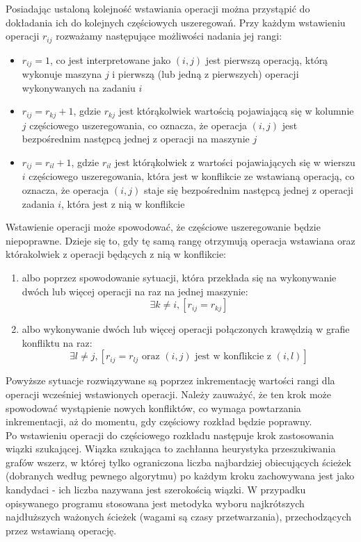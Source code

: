 \documentclass[brudnopis]{xmgr}
\begin{document}
Posiadając ustaloną kolejność wstawiania operacji można przystąpić do dokładania ich do kolejnych częściowych uszeregowań. Przy każdym wstawieniu operacji $r_{ij}$ rozważamy następujące możliwości nadania jej rangi:
\begin{itemize}
    \item $r_{ij} = 1$, co jest interpretowane jako $(i,j)$ jest pierwszą operacją, którą wykonuje maszyna $j$ i pierwszą (lub jedną z pierwszych) operacji wykonywanych na zadaniu $i$
    \item $r_{ij} = r_{kj} + 1$, gdzie $r_{kj}$ jest którąkolwiek wartością pojawiającą się w kolumnie $j$ częściowego uszeregowania, co oznacza, że operacja $(i,j)$ jest bezpośrednim następcą jednej z operacji na maszynie $j$
    \item $r_{ij} = r_{il} + 1$, gdzie $r_{il}$ jest którąkolwiek z wartości pojawiających się w wierszu $i$ częściowego uszeregowania, która jest w konflikcie ze wstawianą operacją, co oznacza, że operacja $(i,j)$ staje się bezpośrednim następcą jednej z operacji zadania $i$, która jest z nią w konflikcie
\end{itemize}

Wstawienie operacji może spowodować, że częściowe uszeregowanie będzie niepoprawne. Dzieje się to, gdy tę samą rangę otrzymują operacja wstawiana oraz którakolwiek z operacji będących z nią w konflikcie:
\begin{enumerate}
    \item albo poprzez spowodowanie sytuacji, która przekłada się na wykonywanie dwóch lub więcej operacji na raz na jednej maszynie:
    $$\exists k \neq i, [r_{ij}=r_{kj}]$$
    \item albo wykonywanie dwóch lub więcej operacji połączonych krawędzią w grafie konfliktu na raz:
    $$\exists l \neq j, [r_{ij}=r_{lj} \textrm{ oraz } (i,j) \textrm{ jest w konflikcie z } (i,l)]$$
\end{enumerate}
 
 Powyższe sytuacje rozwiązywane są poprzez inkrementację wartości rangi dla operacji wcześniej wstawionych operacji. Należy zauważyć, że ten krok może spowodować wystąpienie nowych konfliktów, co wymaga powtarzania inkrementacji, aż do momentu, gdy częściowy rozkład będzie poprawny.\\
 
 Po wstawieniu operacji do częściowego rozkładu następuje krok zastosowania wiązki szukającej.
 Wiązka szukająca to zachłanna heurystyka przeszukiwania grafów wszerz, w której tylko ograniczona liczba najbardziej obiecujących ścieżek (dobranych według pewnego algorytmu) po każdym kroku zachowywana jest jako kandydaci - ich liczba nazywana jest szerokością wiązki.
 W przypadku opisywanego programu stosowana jest metodyka wyboru najkrótszych najdłuższych ważonych ścieżek (wagami są czasy przetwarzania), przechodzących przez wstawianą operację.
 
\end{document}
